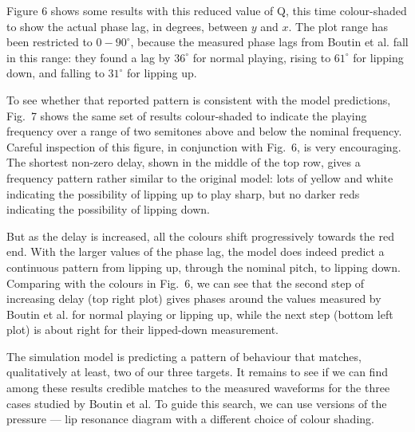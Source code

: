   Figure 6 shows some results with this reduced value of Q, this time 
  colour-shaded to show the actual phase lag, in degrees, between $y$ and $x$. 
  The plot range has been restricted to $0-90^\circ$, because the measured 
  phase lags from Boutin et al. fall in this range: they found a lag by 
  $36^\circ$ for normal playing, rising to $61^\circ$ for lipping down, and 
  falling to $31^\circ$ for lipping up. 


  To see whether that reported pattern is consistent with the model 
  predictions, Fig.\ 7 shows the same set of results colour-shaded to indicate 
  the playing frequency over a range of two semitones above and below the 
  nominal frequency. Careful inspection of this figure, in conjunction with 
  Fig.\ 6, is very encouraging. The shortest non-zero delay, shown in the 
  middle of the top row, gives a frequency pattern rather similar to the 
  original model: lots of yellow and white indicating the possibility of 
  lipping up to play sharp, but no darker reds indicating the possibility of 
  lipping down. 


  But as the delay is increased, all the colours shift progressively towards 
  the red end. With the larger values of the phase lag, the model does indeed 
  predict a continuous pattern from lipping up, through the nominal pitch, to 
  lipping down. Comparing with the colours in Fig.\ 6, we can see that the 
  second step of increasing delay (top right plot) gives phases around the 
  values measured by Boutin et al. for normal playing or lipping up, while the 
  next step (bottom left plot) is about right for their lipped-down 
  measurement. 

  The simulation model is predicting a pattern of behaviour that matches, 
  qualitatively at least, two of our three targets. It remains to see if we can 
  find among these results credible matches to the measured waveforms for the 
  three cases studied by Boutin et al. To guide this search, we can use 
  versions of the pressure --- lip resonance diagram with a different choice of 
  colour shading. 

